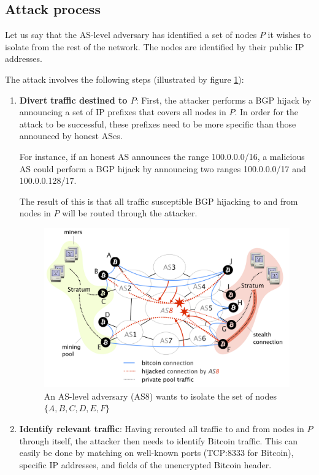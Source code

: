 \documentclass[12pt]{article}
\begin{document}
\subsection{Attack process}

Let us say that the AS-level adversary has identified a set of nodes $P$ it wishes to isolate from the rest of the network. The nodes are identified by their public IP addresses.

The attack involves the following steps (illustrated by figure \ref{fig:partition-attack}):

\begin{enumerate}
    \item \textbf{Divert traffic destined to $P$}: First, the attacker performs a BGP hijack by announcing a set of IP prefixes that covers all nodes in $P$. In order for the attack to be successful, these prefixes need to be more specific than those announced by honest ASes.
    
    For instance, if an honest AS announces the range 100.0.0.0/16, a malicious AS could perform a BGP hijack by announcing two ranges 100.0.0.0/17 and 100.0.0.128/17.
    
The result of this is that all traffic susceptible BGP hijacking to and from nodes in $P$ will be routed through the attacker. 

\begin{figure} [h!]
\centering
\includegraphics[width=0.8\columnwidth]{images/routing-attack.png}
\caption{An AS-level adversary (AS8) wants to isolate the set of nodes $\{A,B,C,D,E,F\}$ \cite{RoutingAttacks}}
\label{fig:partition-attack}
\end{figure}

    \item \textbf{Identify relevant traffic}: Having rerouted all traffic to and from nodes in $P$ through itself, the attacker then needs to identify Bitcoin traffic. This can easily be done by matching on well-known ports (TCP:8333 for Bitcoin), specific IP addresses, and fields of the unencrypted Bitcoin header.
    

\end{enumerate}
\end{document}
